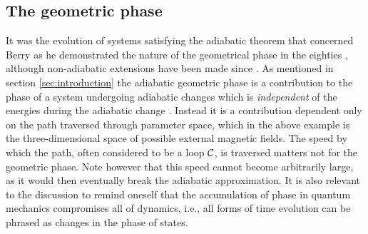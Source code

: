 \documentclass[main.tex]{subfiles}
\begin{document}
\subsection{The geometric phase}\label{sec:geophase}
It was the evolution of systems satisfying the adiabatic theorem that concerned Berry as he
demonstrated the nature of the geometrical phase in the eighties \cite{berry1984}, although non-adiabatic
extensions have been made since \cite{aharonovanandan}. As mentioned in section
\ref{sec:introduction} the adiabatic geometric phase is a contribution to the phase of a
system undergoing adiabatic changes which is \textit{independent} of the energies during the
adiabatic change \cite{erikrev}. %
Instead it is a contribution dependent only on the path traversed through parameter space,
which in the above example is the three-dimensional space of possible external magnetic
fields. The speed by which the path, often considered to be a loop \(\mathbb{\cal C}\), is traversed matters not for the geometric phase.
Note however that this speed cannot become arbitrarily large, as it would then eventually
break the adiabatic approximation. It is also relevant to the discussion to remind oneself
that the accumulation of phase in quantum mechanics compromises all of dynamics, i.e., all forms
of time evolution can be phrased as changes in the phase of states.
\end{document}
